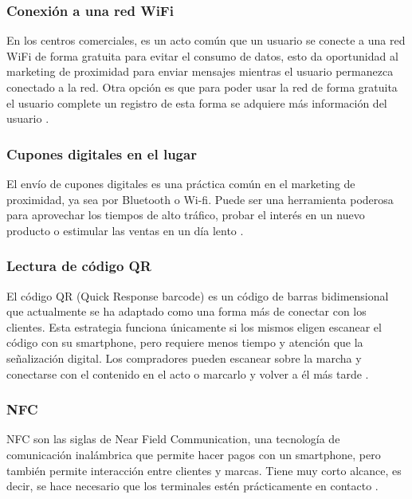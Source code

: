 
\subsubsection{Conexión a una red WiFi}

En los centros comerciales, es un acto común que un usuario se conecte a una red WiFi de forma gratuita para evitar el consumo de datos, esto da oportunidad al marketing de proximidad para enviar mensajes mientras el usuario permanezca conectado a la red. Otra opción es que para poder usar la red de forma gratuita el usuario complete un registro de esta forma se adquiere más información del usuario \cite{MProx}.\\  

\subsubsection{Cupones digitales en el lugar}
El envío de cupones digitales es una práctica común en el marketing de proximidad, ya sea por  
 Bluetooth o Wi-fi. Puede ser una herramienta poderosa para aprovechar los tiempos de alto tráfico, probar el interés en un nuevo producto o estimular las ventas en un día lento \cite{MProx}.\\ 


\subsubsection{Lectura de código QR}
El código QR (Quick Response barcode) es un código de barras bidimensional que actualmente se ha adaptado como una forma más de conectar con los clientes. Esta estrategia funciona únicamente si los mismos eligen escanear el código con su smartphone, pero requiere menos tiempo y atención que la señalización digital. Los compradores pueden escanear sobre la marcha y conectarse con el contenido en el acto o marcarlo y volver a él más tarde \cite{MProx}.\\ 

\subsubsection{NFC}

NFC son las siglas de Near Field Communication, una tecnología de comunicación inalámbrica que permite hacer pagos con un smartphone, pero también permite interacción entre clientes y marcas. Tiene muy corto alcance, es decir, se hace necesario que los terminales estén prácticamente en contacto \cite{MPNFC}. \\ 

